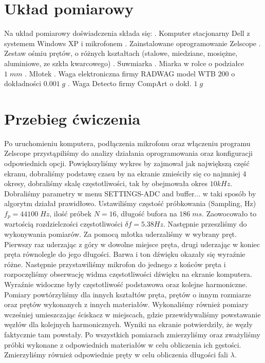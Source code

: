 \documentclass[12pt]{article}
\begin{document}
\section{Układ pomiarowy}
Na układ pomiarowy doświadczenia składa się: . Komputer stacjonarny Dell z systemem Windows XP i mikrofonem . Zainstalowane oprogramowanie Zelscope . Zestaw ośmiu prętów, o różnych kształtach (stalowe, miedziane, mosiężne, 
 aluminiowe, ze szkła kwarcowego) . Suwmiarka . Miarka w rolce o podziałce $1\;mm$ . Młotek . Waga elektroniczna firmy RADWAG model WTB $200$ o dokładności $0.001\;g$ . Waga Detecto firmy CompArt o dokł. $1\;g$ \newline
\section{Przebieg ćwiczenia}
Po uruchomieniu komputera, podłączenia mikrofonu oraz włączeniu programu Zelscope przystąpiliśmy do analizy działania oprogramowania oraz konfiguracji
odpowiednich opcji. Powiększyliśmy wykres by zajmował jak największą część ekranu, dobraliśmy podstawę czasu by na ekranie zmieściły się co najmniej 4 okresy, dobraliśmy skalę częstotliwości, tak by obejmowała okres $10kHz$. Dobraliśmy parametry w menu SETTINGS-ADC and buffer... w taki sposób by algorytm działał prawidłowo. Ustawiliśmy częstość próbkowania (Sampling, Hz) $f_p=44100\;Hz$, ilość próbek $N=16$, długość bufora na $186\;ms$. Zaowocowało to wartością rozdzielczości częstotliwości $\delta{f}=5.38Hz$. Następnie przeszliśmy do wykonywania pomiarów. Za pomocą młotka uderzaliśmy w wybrany pręt. Pierwszy raz uderzając z góry w dowolne miejsce pręta, drugi uderzając w koniec pręta równolegle do jego długości. Barwa i ton dźwięku okazały się wyraźnie różne. Następnie przystawiliśmy mikrofon do jednego z końców pręta i rozpoczęliśmy obserwację widma  częstotliwości dźwięku na ekranie komputera. Wyraźnie widoczne były częstotliwość podstawowa oraz kolejne harmoniczne. Pomiary powtórzyliśmy dla innych kształtów pręta, prętów o innym rozmiarze oraz prętów wykonanych z innych materiałów. Wykonaliśmy również pomiary wcześniej umieszczając ściskacz w miejscach, gdzie przewidywaliśmy powstawanie węzłów dla kolejnych harmonicznych. Wyniki na ekranie potwierdziły, że węzły faktycznie tam powstały. Po wszystkich pomiarach zmierzyliśmy oraz zważyliśmy próbki wykonane z odpowiednich materiałów w celu obliczenia ich gęstości. Zmierzyliśmy również odpowiednie pręty w celu obliczenia długości fali $\lambda$.\newpage
\end{document}
